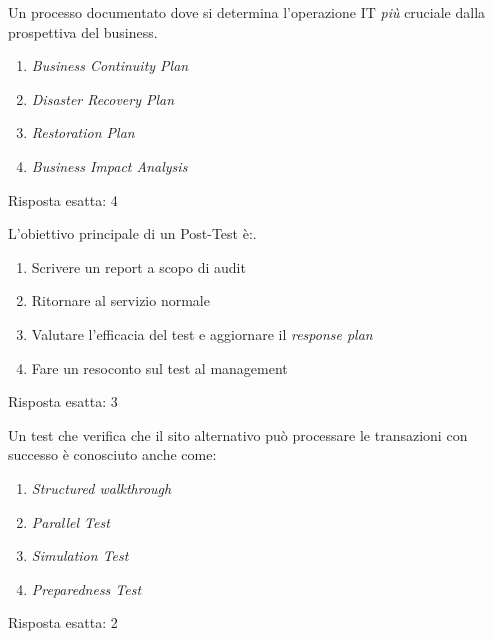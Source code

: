 
\begin{Exercise} [
  title={Quiz},
  label={bcdr8}
 ]

 \Question Un processo documentato dove si determina l'operazione
 IT \emph{più} cruciale dalla prospettiva del business.
 \begin{enumerate}
   \item \textit{Business Continuity Plan}
   \item \textit{Disaster Recovery Plan}
   \item \textit{Restoration Plan}
   \item \textit{Business Impact Analysis}
 \end{enumerate}

\end{Exercise}

\begin{Answer} [
  ref={bcdr8},
  number={8}
 ]

 \Question Risposta esatta: 4
\end{Answer}




\begin{Exercise} [
  title={Quiz},
  label={bcdr9}
 ]

 \Question L'obiettivo principale di un Post-Test è:.
 \begin{enumerate}
   \item Scrivere un report a scopo di audit
   \item Ritornare al servizio normale
   \item Valutare l'efficacia del test e aggiornare il \textit{response
   plan}
   \item Fare un resoconto sul test al management
 \end{enumerate}

\end{Exercise}

\begin{Answer} [
  ref={bcdr9},
  number={9}
 ]

 \Question Risposta esatta: 3
\end{Answer}


\begin{Exercise} [
  title={Quiz},
  label={bcdr10}
 ]

 \Question Un test che verifica che il sito alternativo può processare
 le transazioni con successo è conosciuto anche come:
 \begin{enumerate}
   \item \textit{Structured walkthrough}
   \item \textit{Parallel Test}
   \item \textit{Simulation Test}
   \item \textit{Preparedness Test}
 \end{enumerate}

\end{Exercise}

\begin{Answer} [
  ref={bcdr10},
  number={10}
 ]

 \Question Risposta esatta: 2
\end{Answer}
